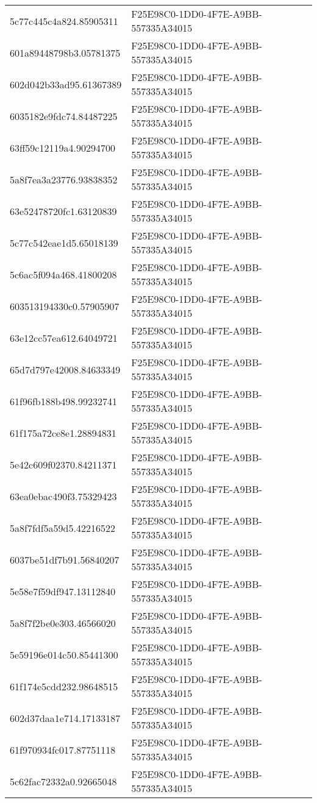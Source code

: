 \begin{tabular}{ll}
5c77c445c4a824.85905311 & F25E98C0-1DD0-4F7E-A9BB-557335A34015 \\
601a89448798b3.05781375 & F25E98C0-1DD0-4F7E-A9BB-557335A34015 \\
602d042b33ad95.61367389 & F25E98C0-1DD0-4F7E-A9BB-557335A34015 \\
6035182e9fdc74.84487225 & F25E98C0-1DD0-4F7E-A9BB-557335A34015 \\
63ff59c12119a4.90294700 & F25E98C0-1DD0-4F7E-A9BB-557335A34015 \\
5a8f7ea3a23776.93838352 & F25E98C0-1DD0-4F7E-A9BB-557335A34015 \\
63e52478720fc1.63120839 & F25E98C0-1DD0-4F7E-A9BB-557335A34015 \\
5c77c542eae1d5.65018139 & F25E98C0-1DD0-4F7E-A9BB-557335A34015 \\
5c6ac5f094a468.41800208 & F25E98C0-1DD0-4F7E-A9BB-557335A34015 \\
603513194330c0.57905907 & F25E98C0-1DD0-4F7E-A9BB-557335A34015 \\
63e12cc57ea612.64049721 & F25E98C0-1DD0-4F7E-A9BB-557335A34015 \\
65d7d797e42008.84633349 & F25E98C0-1DD0-4F7E-A9BB-557335A34015 \\
61f96fb188b498.99232741 & F25E98C0-1DD0-4F7E-A9BB-557335A34015 \\
61f175a72ce8e1.28894831 & F25E98C0-1DD0-4F7E-A9BB-557335A34015 \\
5e42c609f02370.84211371 & F25E98C0-1DD0-4F7E-A9BB-557335A34015 \\
63ea0ebac490f3.75329423 & F25E98C0-1DD0-4F7E-A9BB-557335A34015 \\
5a8f7fdf5a59d5.42216522 & F25E98C0-1DD0-4F7E-A9BB-557335A34015 \\
6037be51df7b91.56840207 & F25E98C0-1DD0-4F7E-A9BB-557335A34015 \\
5e58e7f59df947.13112840 & F25E98C0-1DD0-4F7E-A9BB-557335A34015 \\
5a8f7f2be0e303.46566020 & F25E98C0-1DD0-4F7E-A9BB-557335A34015 \\
5e59196e014c50.85441300 & F25E98C0-1DD0-4F7E-A9BB-557335A34015 \\
61f174e5cdd232.98648515 & F25E98C0-1DD0-4F7E-A9BB-557335A34015 \\
602d37daa1e714.17133187 & F25E98C0-1DD0-4F7E-A9BB-557335A34015 \\
61f970934fc017.87751118 & F25E98C0-1DD0-4F7E-A9BB-557335A34015 \\
5c62fac72332a0.92665048 & F25E98C0-1DD0-4F7E-A9BB-557335A34015 \\

\end{tabular}
